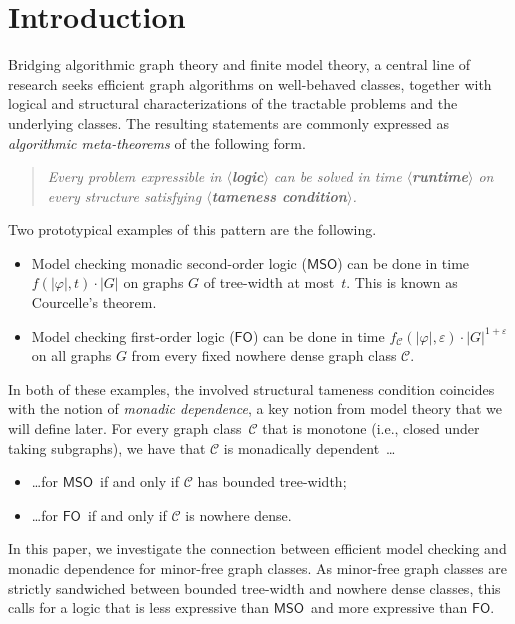 \documentclass[1p,number,11pt]{elsarticle}
\newcommand{\placeholder}[1]{\textup{\textbf{$\boldsymbol{\langle}$#1$\boldsymbol{\rangle}$}}}
\renewcommand{\phi}{\varphi}
\theoremstyle{plain}
\newcommand{\Cc}{\mathscr{C}}
\renewcommand{\FO}{\ensuremath{\mathsf{FO}}}
\newcommand{\MSO}{\ensuremath{\mathsf{MSO}}}
\begin{document}
\section{Introduction}
Bridging algorithmic graph theory and finite model theory, a central line of research seeks efficient graph algorithms on well-behaved classes, together with logical and structural characterizations of the tractable problems and the underlying classes. 
The resulting statements are commonly expressed as \emph{algorithmic meta-theorems} of the following form.
\begin{quote}
\emph{Every problem expressible in \placeholder{logic} can be solved in time \placeholder{runtime} on every structure satisfying \placeholder{tameness condition}.}
\end{quote}
%
Two prototypical examples of this pattern are the following.
\begin{itemize}
    \item Model checking monadic second-order logic (\MSO) can be done in time $f(|\phi|,t)\cdot |G|$ on graphs $G$ of tree-width at most~$t$.
    This is known as Courcelle's theorem.~\cite{arnborg1991,courcelle1990,courcelle1993}

    \item Model checking first-order logic (\FO) can be done in time 
    $f_\Cc(|\phi|,\varepsilon) \cdot |G|^{1+\varepsilon}$ on all graphs $G$ from every fixed nowhere dense graph class $\Cc$.~\cite{grohe2017}
\end{itemize}
In both of these examples, the involved structural tameness condition coincides with the notion of \emph{monadic dependence}, a key notion from model theory that we will define later. For every graph class~$\Cc$ that is monotone (i.e., closed under taking subgraphs), we have that $\Cc$ is monadically dependent~\ldots
\begin{itemize}
    \item \ldots for \MSO~if and only if $\Cc$ has bounded tree-width; \cite{grohe2004learnability}
    \item \ldots for \FO~if and only if $\Cc$ is nowhere dense.~\cite{ADLER2014322}
\end{itemize}
In this paper, we investigate the connection between efficient model checking and monadic dependence for minor-free graph classes. 
As minor-free graph classes are strictly sandwiched between bounded tree-width and nowhere dense classes, this calls for a logic that is less expressive than \MSO~and more expressive than \FO.
\end{document}
